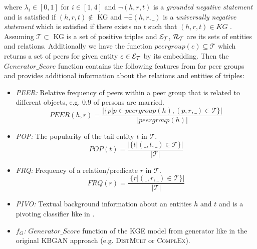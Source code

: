 where $\lambda_i \in [0, 1]$ for $i \in [1,4]$ and $\neg (h, r, t)$ is a \textit{grounded negative statement} and is satisfied if $(h, r, t) \notin$ \ac{KG} and $\neg\exists(h, r, \_)$ is a \textit{universally negative statement} which is satisfied if there exists no $t$ such that $(h, r, t) \in KG$ \cite{arnaout2020enriching}.\\
Assuming $\mathcal{T} \subset $ \ac{KG} is a set of positive triples and $\mathcal{E}_{\mathcal{T}}$, $\mathcal{R}_{\mathcal{T}}$ are its sets of entities and relations.
Additionally we have the function $peergroup(e) \subseteq \mathcal{T}$ which returns a set of peers for given entity $e \in \mathcal{E}_{\mathcal{T}}$ by its embedding. 
Then the $Generator\_Score$ function contains the following features from \cite{arnaout2020enriching} for peer groups and provides additional information about the relations and entities of triples:
\begin{itemize}
    \item 
    \emph{\ac{PEER}:} 
    Relative frequency of peers within a peer group that is related to different objects, e.g. 0.9 of persons are married. 
    \begin{equation}
        PEER(h,r) = \frac{|\{p | p \in peergroup(h), (p, r, \_) \in \mathcal{T}\}|}{|peergroup(h)|}
    \end{equation}

    \item
    \emph{\ac{POP}:} 
    The popularity of the tail entity $t$ in $\mathcal{T}$. 
    \begin{equation}
        POP(t) = \frac{|\{t | (\_, t, \_) \in \mathcal{T}\}|}{|\mathcal{T}|}
    \end{equation}

    \item 
    \emph{\ac{FRQ}:} 
    Frequency of a relation/predicate $r$ in $\mathcal{T}$. 
    \begin{equation}
        FRQ(r) = \frac{|\{r | (\_, r, \_) \in \mathcal{T}\}|}{|\mathcal{T}|}
    \end{equation}
    
    \item 
    \emph{\ac{PIVO}:} 
    Textual background information about an entities $h$ and $t$ and is a pivoting classifier like in \cite{arnaout2020enriching}.
    
    \item 
    \emph{$f_G$:} 
    $Generator\_Score$ function of the \ac{KGE}  model from generator like in the original \ac{KBGAN} approach (e.g. \textsc{DistMult}  or \textsc{ComplEx}).
    
\end{itemize}
